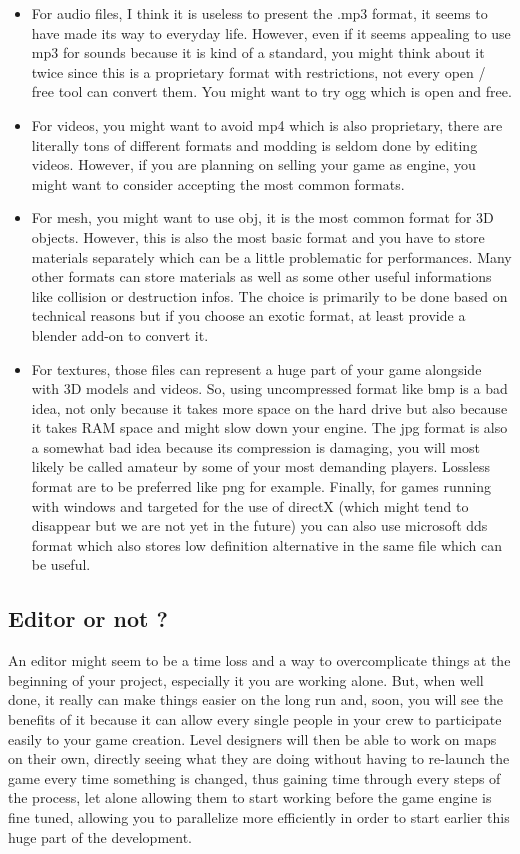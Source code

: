\documentclass[a4paper,12pt]{article}
\begin{document}
\begin{itemize}
\item For audio files, I think it is useless to present the .mp3 format, it seems to have made its way to everyday life. However, even if it seems appealing to use mp3 for sounds because it is kind of a standard, you might think about it twice since this is a proprietary format with restrictions, not every open / free tool can convert them. You might want to try ogg which is open and free.
\item For videos, you might want to avoid mp4 which is also proprietary, there are literally tons of different formats and modding is seldom done by editing videos. However, if you are planning on selling your game as engine, you might want to consider accepting the most common formats.
\item For mesh, you might want to use obj, it is the most common format for 3D objects. However, this is also the most basic format and you have to store materials separately which can be a little problematic for performances. Many other formats can store materials as well as some other useful informations like collision or destruction infos. The choice is primarily to be done based on technical reasons but if you choose an exotic format, at least provide a blender add-on to convert it.
\item For textures, those files can represent a huge part of your game alongside with 3D models and videos. So, using uncompressed format like bmp is a bad idea, not only because it takes more space on the hard drive but also because it takes RAM space and might slow down your engine. The jpg format is also a somewhat bad idea because its compression is damaging, you will most likely be called amateur by some of your most demanding players. Lossless format are to be preferred like png for example. Finally, for games running with windows and targeted for the use of directX (which might tend to disappear but we are not yet in the future) you can also use microsoft dds format which also stores low definition alternative in the same file which can be useful.
\end{itemize}

\subsection{Editor or not ?}
An editor might seem to be a time loss and a way to overcomplicate things at the beginning of your project, especially it you are working alone. But, when well done, it really can make things easier on the long run and, soon, you will see the benefits of it because it can allow every single people in your crew to participate easily to your game creation. Level designers will then be able to work on maps on their own, directly seeing what they are doing without having to re-launch the game every time something is changed, thus gaining time through every steps of the process, let alone allowing them to start working before the game engine is fine tuned, allowing you to parallelize more efficiently in order to start earlier this huge part of the development.
\end{document}
